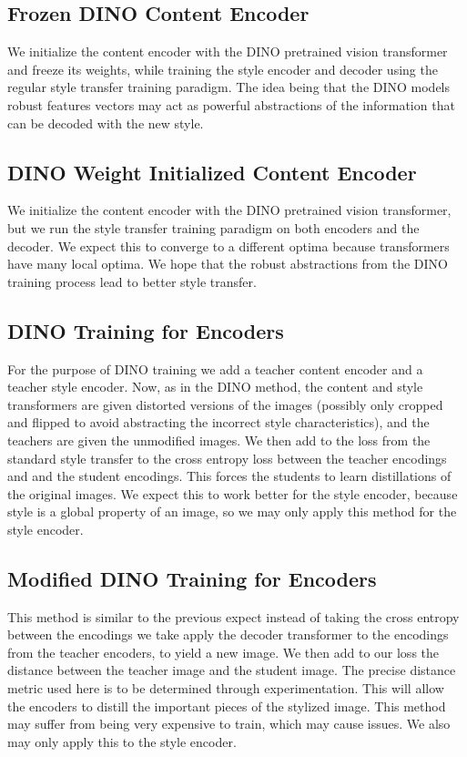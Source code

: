 \documentclass{article}
\begin{document}
\subsection{Frozen DINO Content Encoder}

We initialize the content encoder with the DINO pretrained vision transformer and freeze its weights, while training the style encoder and decoder using the regular style transfer training paradigm. The idea being that the DINO models robust features vectors may act as powerful abstractions of the information that can be decoded with the new style.

\subsection{DINO Weight Initialized Content Encoder}

We initialize the content encoder with the DINO pretrained vision transformer, but we run the style transfer training paradigm on both encoders and the decoder. We expect this to converge to a different optima because transformers have many local optima. We hope that the robust abstractions from the DINO training process lead to better style transfer.

\subsection{DINO Training for Encoders}

For the purpose of DINO training we add a teacher content encoder and a teacher style encoder. Now, as in the DINO method, the content and style transformers are given distorted versions of the images (possibly only cropped and flipped to avoid abstracting the incorrect style characteristics), and the teachers are given the unmodified images. We then add to the loss from the standard style transfer to the cross entropy loss between the teacher encodings and and the student encodings. This forces the students to learn distillations of the original images. We expect this to work better for the style encoder, because style is a global property of an image, so we may only apply this method for the style encoder.

\subsection{Modified DINO Training for Encoders}

This method is similar to the previous expect instead of taking the cross entropy between the encodings we take apply the decoder transformer to the encodings from the teacher encoders, to yield a new image. We then add to our loss the distance between the teacher image and the student image. The precise distance metric used here is to be determined through experimentation. This will allow the encoders to distill the important pieces of the stylized image. This method may suffer from being very expensive to train, which may cause issues. We also may only apply this to the style encoder.

\medskip

\nocite{*}


\end{document}
